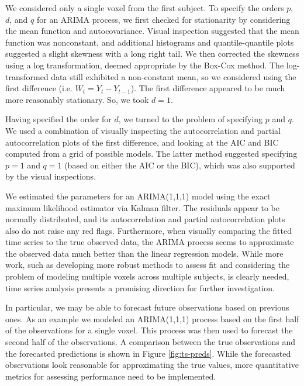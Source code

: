 \par \indent We considered only a single voxel from the first subject. To specify the orders $p$, $d$, and $q$ for an ARIMA process, we first checked for stationarity by considering the mean function and autocovariance. Visual inspection suggested that the mean function was nonconstant, and additional histograms and quantile-quantile plots suggested a slight skewness with a long right tail. We then corrected the skewness using a log transformation, deemed appropriate by the Box-Cox method. The log-transformed data still exhibited a non-constant mean, so we considered using the first difference (i.e. $W_t = Y_t - Y_{t-1}$). The first difference appeared to be much more reasonably stationary. So, we took $d=1$. 
\par Having specified the order for $d$, we turned to the problem of specifying $p$ and $q$. We used a combination of visually inspecting the autocorrelation and partial autocorrelation plots of the first difference, and looking at the AIC and BIC computed from a grid of possible models. The latter method suggested specifying $p=1$ and $q=1$ (based on either the AIC or the BIC), which was also supported by the visual inspections. 
\par We estimated the parameters for an ARIMA(1,1,1) model using the exact maximum likelihood estimator via Kalman filter. The residuals appear to be normally distributed, and its autocorrelation and partial autocorrelation plots also do not raise any red flags. Furthermore, when visually comparing the fitted time series to the true observed data, the ARIMA process seems to approximate the observed data much better than the linear regression models. While more work, such as developing more robust methods to assess fit and considering the problem of modeling multiple voxels across multiple subjects, is clearly needed, time series analysis presents a promising direction for further investigation. 
\par In particular, we may be able to forecast future observations based on previous ones. As an example we modeled an ARIMA(1,1,1) process based on the first half of the observations for a single voxel. This process was then used to forecast the second half of the observations. A comparison between the true observations and the forecasted predictions is shown in Figure \ref{fig:ts-preds}. While the forecasted observations look reasonable for approximating the true values, more quantitative metrics for assessing performance need to be implemented. 

